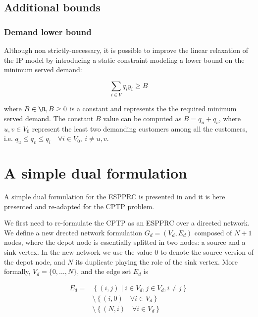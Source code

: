\subsection{Additional bounds}

\subsubsection{Demand lower bound}\label{sec:demand-lower-bound}
Although non strictly-necessary, it is possible to improve the linear relaxation of the IP model by introducing a static constraint modeling a lower bound on the minimum served demand:

\begin{equation}\label{eq:resource-lower-bound-constraint}
	\sum_{i \in V} q_i y_i   \ge B
\end{equation}

where $B \in \R, B \ge 0$ is a constant and represents the the required minimum served demand.
The constant $B$ value can be computed as $B = q_u + q_v$, where $u, v \in V_0$ represent the least two demanding customers among all the customers, i.e. $q_u \le q_v \le q_i \quad \forall i \in V_0,\ i \ne u, v$.

\section{A simple dual formulation}\label{sec:cptp-simple-dual-formulation}

A simple dual formulation for the ESPPRC is presented in \cite{beasley1989algorithm} and it is here presented and re-adapted for the CPTP problem.

We first need to re-formulate the CPTP as an ESPPRC over a directed network.
We define a new drected network formulation $G_d = (V_d, E_d)$ composed of $N + 1$ nodes, where the depot node is essentially splitted in two nodes: a source and a sink vertex.
In the new network we use the value $0$ to denote the source version of the depot node, and $N$ its duplicate playing the role of the sink vertex.
More formally, $V_d = \{ 0, \dots, N  \}$, and the edge set $E_d$ is

\begin{equation}
	\begin{aligned}
		E_d = & \left\{ (i, j) \mid i \in V_d, j \in V_d, i \ne j \right\} \\
		      & \setminus \left\{ (i, 0) \quad \forall i \in V_d \right\}  \\
		      & \setminus \left\{ (N, i) \quad \forall i \in V_d \right\}
	\end{aligned}
\end{equation}

